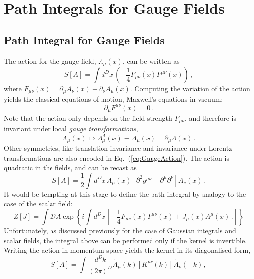 \documentclass[notes]{subfiles}
\renewcommand{\munu}{{\mu\nu}}
\begin{document}
\chapter{Path Integrals for Gauge Fields}
\label{cha:path-integrals-gauge}
\section{Path Integral for Gauge Fields}
\label{sec:gauge-fields}

The action for the gauge field, $A_\mu(x)$, can be written as
\begin{equation}
  \label{eq:GaugeAction}
  S[A] = \int d^Dx\, \left(-\frac14 F_{\mu\nu}(x)
    F^{\mu\nu}(x)\right)\, ,
\end{equation}
where $F_{\mu\nu}(x)=\partial_\mu A_\nu(x) - \partial_\nu A_\mu(x)$. 
Computing the variation of the action yields the classical equations
of motion, \ie Maxwell's equations in vacuum: 
\begin{equation}
  \label{eq:MaxEqs}
  \partial_\mu F^{\mu\nu}(x) = 0\, .
\end{equation}
Note that the action only depends on the field strength $F_\munu$,
and therefore is invariant under local {\em gauge transformations},
\begin{equation}
  \label{eq:GaugeTransf}
  A_\mu(x) \mapsto A^\Lambda_\mu(x) = A_\mu(x) + \partial_\mu \Lambda(x)\, .
\end{equation}
Other symmetries, like translation invariance and invariance under
Lorentz transformations are also encoded in
Eq.~(\ref{eq:GaugeAction}). 
The action is quadratic in the fields, and can be recast as 
\begin{equation}
  \label{eq:GaugeActionTwo}
  S[A] = \frac12 \int d^Dx\, A_\mu(x) \left[
    \partial^2 g^{\mu\nu} - \partial^\mu \partial^\nu
    \right] A_\nu(x)\, .
\end{equation}
It would be tempting at this stage to define the path integral by
analogy to the case of the scalar field:
\begin{equation}
  \label{eq:WrongPathInt}
  Z[J] = \int \mathcal{D}A \exp\left\{
    i \int d^Dx\, \left[
      -\frac14 F_{\mu\nu}(x) F^\munu(x) + J_\mu(x) A^\mu(x)\, .
      \right]
    \right\}
\end{equation}
Unfortunately, as discussed previously for the case of Gaussian
integrals and scalar fields, the integral above can be performed only
if the kernel is invertible. Writing the action in momentum space
yields the kernel in its diagonalised form, 
\begin{equation}
  \label{eq:GaugeActionMom}
  S[A] = \int \frac{d^Dk}{(2\pi)^D} \tilde{A}_\mu(k) \left[
    K^\munu(k)
    \right] \tilde{A}_\nu(-k)\, ,
\end{equation}
\end{document}
